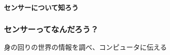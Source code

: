 \begin{frame}[plain]
    \begin{center}
        \vspace{48pt}
        {\huge\bf センサーについて知ろう}
    \end{center}
\end{frame}

\begin{frame}[fragile]
    \frametitle{センサーってなんだろう？}
    \vspace{12pt}
    身の回りの世界の情報を調べ、コンピュータに伝える
    \begin{center}
        \vspace{12pt}
        
    \end{center}
\end{frame}

